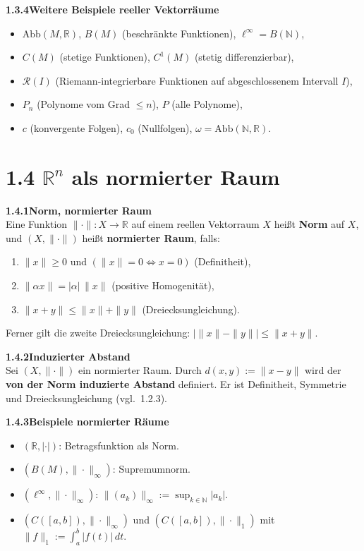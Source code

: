 \documentclass[a4paper,12pt]{article}
\newcommand{\gentry}[3]{%
  \noindent\textbf{#1\quad #2}\nopagebreak\\[0.2em]
  #3\par\smallskip
}
\begin{document}
\gentry{1.3.4}{Weitere Beispiele reeller Vektorräume}{%
  \begin{itemize}[topsep=2pt,itemsep=1pt]
    \item $\mathrm{Abb}(M, \mathbb{R})$, $B(M)$ (beschränkte Funktionen), $\ell^\infty = B(\mathbb{N})$,
    \item $C(M)$ (stetige Funktionen), $C^1(M)$ (stetig differenzierbar),
    \item $\mathcal{R}(I)$ (Riemann-integrierbare Funktionen auf abgeschlossenem Intervall $I$),
    \item $P_n$ (Polynome vom Grad $\leq n$), $P$ (alle Polynome),
    \item $c$ (konvergente Folgen), $c_0$ (Nullfolgen), $\omega = \mathrm{Abb}(\mathbb{N}, \mathbb{R})$.
  \end{itemize}
}

\section*{1.4 \quad $\mathbb{R}^n$ als normierter Raum}

\gentry{1.4.1}{Norm, normierter Raum}{%
  Eine Funktion $\|\cdot\|: X \to \mathbb{R}$ auf einem reellen Vektorraum $X$ heißt
  \textbf{Norm} auf $X$, und $(X, \|\cdot\|)$ heißt \textbf{normierter Raum}, falls:
  \begin{enumerate}[label=(\roman*),topsep=2pt,itemsep=1pt]
    \item $\|x\| \geq 0$ und $(\|x\| = 0 \Leftrightarrow x = 0)$ \quad (Definitheit),
    \item $\|\alpha x\| = |\alpha|\,\|x\|$ \quad (positive Homogenität),
    \item $\|x + y\| \leq \|x\| + \|y\|$ \quad (Dreiecksungleichung).
  \end{enumerate}
  Ferner gilt die zweite Dreiecksungleichung: $\bigl|\|x\| - \|y\|\bigr| \leq \|x+y\|$.
}

\gentry{1.4.2}{Induzierter Abstand}{%
  Sei $(X, \|\cdot\|)$ ein normierter Raum. Durch $d(x, y) := \|x - y\|$ wird der
  \textbf{von der Norm induzierte Abstand} definiert. Er ist Definitheit, Symmetrie
  und Dreiecksungleichung (vgl.\ 1.2.3).
}

\gentry{1.4.3}{Beispiele normierter Räume}{%
  \begin{itemize}[topsep=2pt,itemsep=1pt]
    \item $(\mathbb{R}, |\cdot|)$: Betragsfunktion als Norm.
    \item $(B(M), \|\cdot\|_\infty)$: Supremumnorm.
    \item $(\ell^\infty, \|\cdot\|_\infty)$: $\|(a_k)\|_\infty := \sup_{k \in \mathbb{N}} |a_k|$.
    \item $(C([a,b]), \|\cdot\|_\infty)$ und $(C([a,b]), \|\cdot\|_1)$ mit $\|f\|_1 := \int_a^b |f(t)|\,dt$.
  \end{itemize}
}
\end{document}
